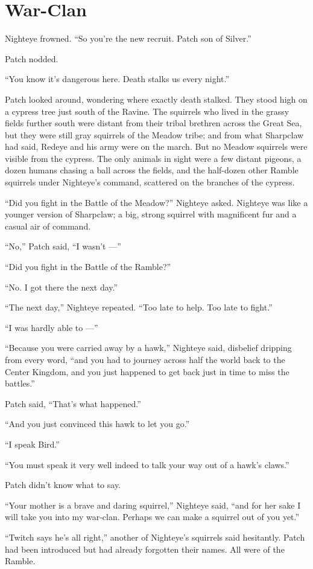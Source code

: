 \documentclass[ebook,oneside,openany,17pt]{memoir}
\renewcommand{\thechapter}{\Roman{chapter}}
\newcounter{sections}
\newcommand{\sections}[1]{%
  \section*{#1}
  \addtocounter{sections}{1}%
  \pdfbookmark[1]{#1}{section.\thechapter.\thesections}}
\begin{document}

\sections{War-Clan}

Nighteye frowned. “So you’re the new recruit. Patch son of Silver.”

Patch nodded.

“You know it’s dangerous here. Death stalks us every night.”

Patch looked around, wondering where exactly death stalked. They stood
high on a cypress tree just south of the Ravine. The squirrels who
lived in the grassy fields further south were distant from their
tribal brethren across the Great Sea, but they were still gray
squirrels of the Meadow tribe; and from what Sharpclaw had said,
Redeye and his army were on the march. But no Meadow squirrels were
visible from the cypress. The only animals in sight were a few distant
pigeons, a dozen humans chasing a ball across the fields, and the
half-dozen other Ramble squirrels under Nighteye’s command, scattered
on the branches of the cypress.

“Did you fight in the Battle of the Meadow?” Nighteye asked. Nighteye
was like a younger version of Sharpclaw; a big, strong squirrel with
magnificent fur and a casual air of command.

“No,” Patch said, “I wasn’t —”

“Did you fight in the Battle of the Ramble?”

“No. I got there the next day.”

“The next day,” Nighteye repeated. “Too late to help. Too late to
fight.”

“I was hardly able to —”

“Because you were carried away by a hawk,” Nighteye said, disbelief
dripping from every word, “and you had to journey across half the
world back to the Center Kingdom, and you just happened to get back
just in time to miss the battles.”

Patch said, “That’s what happened.”

“And you just convinced this hawk to let you go.”

“I speak Bird.”

“You must speak it very well indeed to talk your way out of a hawk’s
claws.”

Patch didn’t know what to say.

“Your mother is a brave and daring squirrel,” Nighteye said, “and for
her sake I will take you into my war-clan. Perhaps we can make a
squirrel out of you yet.”

“Twitch says he’s all right,” another of Nighteye’s squirrels said
hesitantly. Patch had been introduced but had already forgotten their
names. All were of the Ramble.
\end{document}
